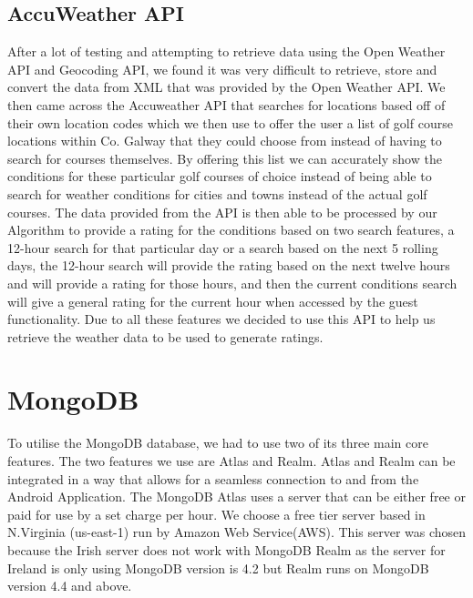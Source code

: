 \subsection{AccuWeather API}
After a lot of testing and attempting to retrieve data using the Open Weather API and Geocoding API, we found it was very difficult to retrieve, store and convert the data from XML that was provided by the Open Weather API. We then came across the Accuweather API that searches for locations based off of their own location codes which we then use to offer the user a list of golf course locations within Co. Galway that they could choose from instead of having to search for courses themselves.
\newline
\newline
\newline
By offering this list we can accurately show the conditions for these particular golf courses of choice instead of being able to search for weather conditions for cities and towns instead of the actual golf courses.
\newline
\newline
The data provided from the API is then able to be processed by our Algorithm to provide a rating for the conditions based on two search features, a 12-hour search for that particular day or a search based on the next 5 rolling days, the 12-hour search will provide the rating based on the next twelve hours and will provide a rating for those hours, and then the current conditions search will give a general rating for the current hour when accessed by the guest functionality. Due to all these features we decided to use this API to help us retrieve the weather data to be used to generate ratings.

\section{MongoDB}
To utilise the MongoDB database, we had to use two of its three main core features. The two features we use are Atlas and Realm. Atlas and Realm can be integrated in a way that allows for a seamless connection to and from the Android Application. The MongoDB Atlas uses a server that can be either free or paid for use by a set charge per hour. We choose a free tier server based in N.Virginia (us-east-1) run by Amazon Web Service(AWS). This server was chosen because the Irish server does not work with MongoDB Realm as the server for Ireland is only using MongoDB version is 4.2 but Realm runs on MongoDB version 4.4 and above.
